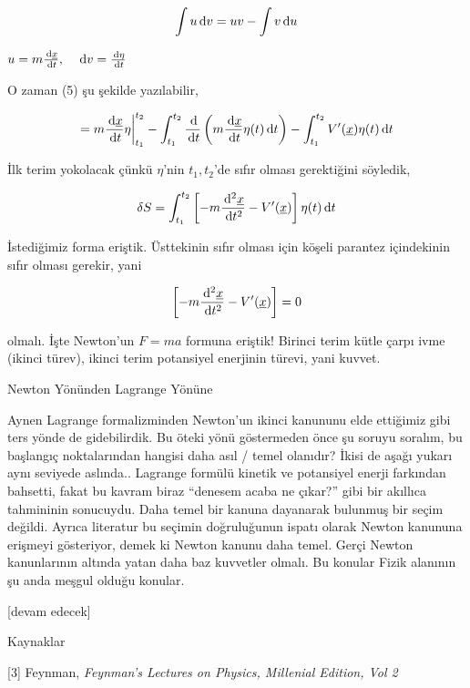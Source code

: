 \documentclass[12pt,fleqn]{article}\usepackage{../../common}
\begin{document}
$$ 
\int u \,\mathrm{d} v = uv - \int v \,\mathrm{d} u
$$

$u = m \frac{\,\mathrm{d}\underline{x}}{\,\mathrm{d} t}, \quad \,\mathrm{d} v = \frac{\,\mathrm{d} \eta}{\,\mathrm{d} t}$

O zaman (5) şu şekilde yazılabilir,

$$ 
= m \frac{\,\mathrm{d} \underline{x}}{\,\mathrm{d} t} \eta \bigg\vert_{t_1}^{t_2} 
- \int_{t_1}^{t_2} \frac{\,\mathrm{d}}{\,\mathrm{d} t} \left( m \frac{\,\mathrm{d} \underline{x}}{\,\mathrm{d} t} \eta(t) \,\mathrm{d} t\right)
- \int_{t_1}^{t_2} V'(\underline{x}) \eta(t) \,\mathrm{d} t
$$

İlk terim yokolacak çünkü $\eta$'nin $t_1,t_2$'de sıfır olması gerektiğini söyledik,

$$ 
\delta S = 
\int_{t_1}^{t_2} \left[ 
-m \frac{\,\mathrm{d}^2 \underline{x}}{\,\mathrm{d} t^2} - V'(\underline{x})
\right] 
\eta(t) \,\mathrm{d} t
$$

İstediğimiz forma eriştik. Üsttekinin sıfır olması için köşeli parantez
içindekinin sıfır olması gerekir, yani

$$ 
\left[ 
-m \frac{\,\mathrm{d}^2 \underline{x}}{\,\mathrm{d} t^2} - V'(\underline{x})
\right]  = 0
$$

olmalı. İşte Newton'un $F = ma$ formuna eriştik! Birinci terim kütle çarpı
ivme (ikinci türev), ikinci terim potansiyel enerjinin türevi, yani kuvvet.

Newton Yönünden Lagrange Yönüne

Aynen Lagrange formalizminden Newton'un ikinci kanununu elde ettiğimiz gibi ters
yönde de gidebilirdik. Bu öteki yönü göstermeden önce şu soruyu soralım, bu
başlangıç noktalarından hangisi daha asıl / temel olanıdır? İkisi de aşağı
yukarı aynı seviyede aslında.. Lagrange formülü kinetik ve potansiyel enerji
farkından bahsetti, fakat bu kavram biraz ``denesem acaba ne çıkar?'' gibi bir
akıllıca tahmininin sonucuydu. Daha temel bir kanuna dayanarak bulunmuş bir
seçim değildi. Ayrıca literatur bu seçimin doğruluğunun ispatı olarak Newton
kanununa erişmeyi gösteriyor, demek ki Newton kanunu daha temel. Gerçi Newton
kanunlarının altında yatan daha baz kuvvetler olmalı. Bu konular Fizik alanının
şu anda meşgul olduğu konular.


[devam edecek]

Kaynaklar 

[3] Feynman, {\em Feynman's Lectures on Physics, Millenial Edition, Vol 2} 
\end{document}
